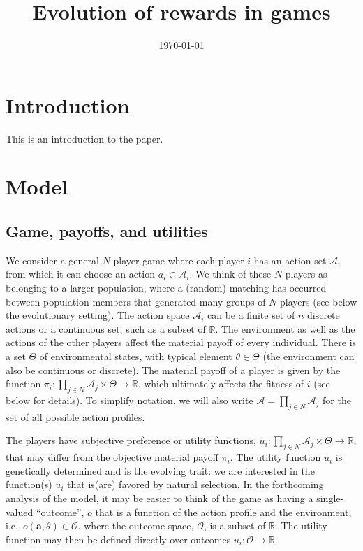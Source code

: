\documentclass[11pt,reqno]{amsart}
\title[Preferences and learning]{Evolution of rewards in games}
\date{\today}
\newcommand{\e}{\theta} %
\newcommand{\Et}{\Theta} %
\newcommand{\na}{n} %
\newcommand{\ac}{a} %
\newcommand{\Ac}{\mathcal{A}} %
\newcommand{\va}{\mathbf{a}} %
\newcommand{\pay}{\pi} %
\newcommand{\Rn}{\mathds{R}} %
\newcommand{\np}{N}%
\newcommand{\om}{o} %
\newcommand{\Om}{\mathcal{O}} %
\newcommand{\pf}{u} %
\begin{document}
\maketitle





\section{Introduction}

This is an introduction to the paper.

\section{Model}


\subsection{Game, payoffs, and utilities}


We consider a general $\np$-player game where each player $i$ has an action set $\Ac_i$ from which it can choose an action $\ac_i \in \Ac_i$. We think of these $\np$ players as belonging to a larger population, where a (random) matching has occurred between population members that generated many groups of $\np$ players (see below the evolutionary setting). The action space $\Ac_i$ can be a finite set of $\na$ discrete actions or a continuous set, such as a subset of $\Rn$. The environment as well as the actions of the other players affect the material payoff of every individual. There is a set $\Et$ of environmental states, with typical element $\e\in\Et$ (the environment can also be continuous or discrete). The material payoff of a player is given by the function $\pay_i : \prod_{j\in \np} \Ac_j \times \Et  \to \Rn$, which ultimately affects the fitness of $i$ (see below for details). To simplify notation, we will also write $\Ac = \prod_{j\in \np} \Ac_j$ for the set of all possible action profiles.

The players have subjective preference or utility functions, $\pf_i : \prod_{j\in \np} \Ac_j \times \Et  \to \Rn$, that may differ from the objective material payoff $\pay_i$. The utility function $\pf_i$ is genetically determined and is the evolving trait: we are interested in the function(s) $\pf_i$ that is(are) favored by natural selection. In the forthcoming analysis of the model, it may be easier to think of the game as having a single-valued ``outcome'', $\om$ that is a function of the action profile and the environment, i.e.~$\om(\va,\e)\in \Om$, where the outcome space, $\Om$, is a subset of $\Rn$. The utility function may then be defined directly over outcomes $\pf_i : \Om  \to \Rn$.
\end{document}
